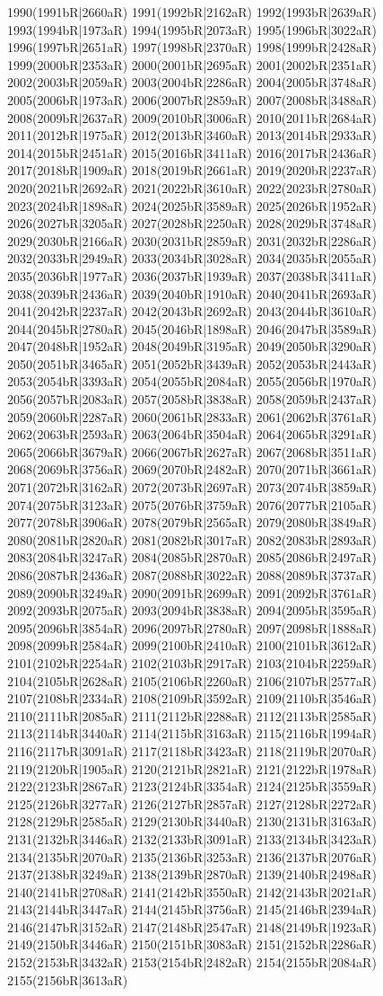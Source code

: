 1990(1991bR|2660aR) 1991(1992bR|2162aR) 1992(1993bR|2639aR) 1993(1994bR|1973aR) 1994(1995bR|2073aR) 1995(1996bR|3022aR) 1996(1997bR|2651aR) 1997(1998bR|2370aR) 1998(1999bR|2428aR) 1999(2000bR|2353aR) 2000(2001bR|2695aR) 2001(2002bR|2351aR) 2002(2003bR|2059aR) 2003(2004bR|2286aR) 2004(2005bR|3748aR) 2005(2006bR|1973aR) 2006(2007bR|2859aR) 2007(2008bR|3488aR) 2008(2009bR|2637aR) 2009(2010bR|3006aR) 2010(2011bR|2684aR) 2011(2012bR|1975aR) 2012(2013bR|3460aR) 2013(2014bR|2933aR) 2014(2015bR|2451aR) 2015(2016bR|3411aR) 2016(2017bR|2436aR) 2017(2018bR|1909aR) 2018(2019bR|2661aR) 2019(2020bR|2237aR) 2020(2021bR|2692aR) 2021(2022bR|3610aR) 2022(2023bR|2780aR) 2023(2024bR|1898aR) 2024(2025bR|3589aR) 2025(2026bR|1952aR) 2026(2027bR|3205aR) 2027(2028bR|2250aR) 2028(2029bR|3748aR) 2029(2030bR|2166aR) 2030(2031bR|2859aR) 2031(2032bR|2286aR) 2032(2033bR|2949aR) 2033(2034bR|3028aR) 2034(2035bR|2055aR) 2035(2036bR|1977aR) 2036(2037bR|1939aR) 2037(2038bR|3411aR) 2038(2039bR|2436aR) 2039(2040bR|1910aR) 2040(2041bR|2693aR) 2041(2042bR|2237aR) 2042(2043bR|2692aR) 2043(2044bR|3610aR) 2044(2045bR|2780aR) 2045(2046bR|1898aR) 2046(2047bR|3589aR) 2047(2048bR|1952aR) 2048(2049bR|3195aR) 2049(2050bR|3290aR) 2050(2051bR|3465aR) 2051(2052bR|3439aR) 2052(2053bR|2443aR) 2053(2054bR|3393aR) 2054(2055bR|2084aR) 2055(2056bR|1970aR) 2056(2057bR|2083aR) 2057(2058bR|3838aR) 2058(2059bR|2437aR) 2059(2060bR|2287aR) 2060(2061bR|2833aR) 2061(2062bR|3761aR) 2062(2063bR|2593aR) 2063(2064bR|3504aR) 2064(2065bR|3291aR) 2065(2066bR|3679aR) 2066(2067bR|2627aR) 2067(2068bR|3511aR) 2068(2069bR|3756aR) 2069(2070bR|2482aR) 2070(2071bR|3661aR) 2071(2072bR|3162aR) 2072(2073bR|2697aR) 2073(2074bR|3859aR) 2074(2075bR|3123aR) 2075(2076bR|3759aR) 2076(2077bR|2105aR) 2077(2078bR|3906aR) 2078(2079bR|2565aR) 2079(2080bR|3849aR) 2080(2081bR|2820aR) 2081(2082bR|3017aR) 2082(2083bR|2893aR) 2083(2084bR|3247aR) 2084(2085bR|2870aR) 2085(2086bR|2497aR) 2086(2087bR|2436aR) 2087(2088bR|3022aR) 2088(2089bR|3737aR) 2089(2090bR|3249aR) 2090(2091bR|2699aR) 2091(2092bR|3761aR) 2092(2093bR|2075aR) 2093(2094bR|3838aR) 2094(2095bR|3595aR) 2095(2096bR|3854aR) 2096(2097bR|2780aR) 2097(2098bR|1888aR) 2098(2099bR|2584aR) 2099(2100bR|2410aR) 2100(2101bR|3612aR) 2101(2102bR|2254aR) 2102(2103bR|2917aR) 2103(2104bR|2259aR) 2104(2105bR|2628aR) 2105(2106bR|2260aR) 2106(2107bR|2577aR) 2107(2108bR|2334aR) 2108(2109bR|3592aR) 2109(2110bR|3546aR) 2110(2111bR|2085aR) 2111(2112bR|2288aR) 2112(2113bR|2585aR) 2113(2114bR|3440aR) 2114(2115bR|3163aR) 2115(2116bR|1994aR) 2116(2117bR|3091aR) 2117(2118bR|3423aR) 2118(2119bR|2070aR) 2119(2120bR|1905aR) 2120(2121bR|2821aR) 2121(2122bR|1978aR) 2122(2123bR|2867aR) 2123(2124bR|3354aR) 2124(2125bR|3559aR) 2125(2126bR|3277aR) 2126(2127bR|2857aR) 2127(2128bR|2272aR) 2128(2129bR|2585aR) 2129(2130bR|3440aR) 2130(2131bR|3163aR) 2131(2132bR|3446aR) 2132(2133bR|3091aR) 2133(2134bR|3423aR) 2134(2135bR|2070aR) 2135(2136bR|3253aR) 2136(2137bR|2076aR) 2137(2138bR|3249aR) 2138(2139bR|2870aR) 2139(2140bR|2498aR) 2140(2141bR|2708aR) 2141(2142bR|3550aR) 2142(2143bR|2021aR) 2143(2144bR|3447aR) 2144(2145bR|3756aR) 2145(2146bR|2394aR) 2146(2147bR|3152aR) 2147(2148bR|2547aR) 2148(2149bR|1923aR) 2149(2150bR|3446aR) 2150(2151bR|3083aR) 2151(2152bR|2286aR) 2152(2153bR|3432aR) 2153(2154bR|2482aR) 2154(2155bR|2084aR) 2155(2156bR|3613aR) 